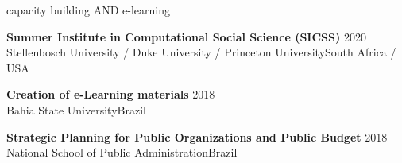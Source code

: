 \begin{rSection}{capacity building AND e-learning}

{\textbf{Summer Institute in Computational Social Science (SICSS)}} {\hfill{2020}}\\
{Stellenbosch University / Duke University / Princeton University}\hfill{South Africa / USA}\par
\textbf{Creation of e-Learning materials} \hfill{2018} \\
{Bahia State University}\hfill{Brazil}\par
\textbf{Strategic Planning for Public Organizations and Public Budget} \hfill{2018} \\ 
{National School of Public Administration}\hfill{Brazil}

\end{rSection}
\vspace{1em}